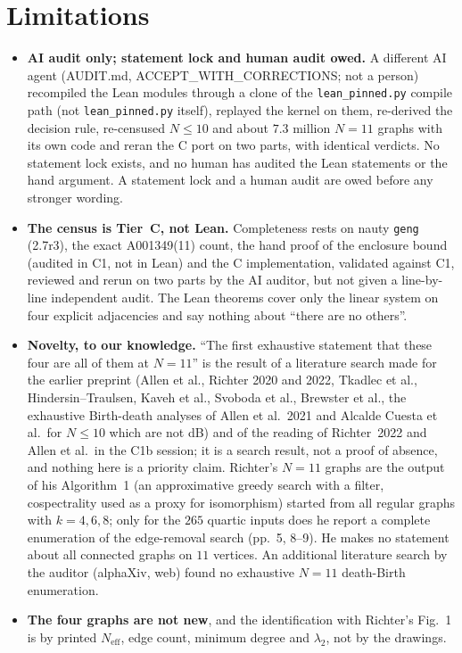 \documentclass[10pt]{article}
\newcommand{\Neff}{N_{\mathrm{eff}}}
\begin{document}
\section{Limitations}\label{sec:lim}
\begin{itemize}\itemsep=1pt
\item \textbf{AI audit only; statement lock and human audit owed.} A different AI agent (AUDIT.md, ACCEPT\_WITH\_CORRECTIONS; not a person) recompiled the Lean modules through a clone of the \texttt{lean\_pinned.py} compile path (not \texttt{lean\_pinned.py} itself), replayed the kernel on them, re-derived the decision rule, re-censused $N\le10$ and about $7.3$ million $N=11$ graphs with its own code and reran the C port on two parts, with identical verdicts. No statement lock exists, and no human has audited the Lean statements or the hand argument. A statement lock and a human audit are owed before any stronger wording.
\item \textbf{The census is Tier~C, not Lean.} Completeness rests on nauty \texttt{geng} (2.7r3), the exact A001349(11) count, the hand proof of the enclosure bound (audited in C1, not in Lean) and the C implementation, validated against C1, reviewed and rerun on two parts by the AI auditor, but not given a line-by-line independent audit. The Lean theorems cover only the linear system on four explicit adjacencies and say nothing about ``there are no others''.
\item \textbf{Novelty, to our knowledge.} ``The first exhaustive statement that these four are all of them at $N=11$'' is the result of a literature search made for the earlier preprint (Allen et al., Richter 2020 and 2022, Tkadlec et al., Hindersin--Traulsen, Kaveh et al., Svoboda et al., Brewster et al., the exhaustive Birth-death analyses of Allen et al.~2021 and Alcalde Cuesta et al.\ for $N\le10$ which are not dB) and of the reading of Richter~2022 and Allen et al.\ in the C1b session; it is a search result, not a proof of absence, and nothing here is a priority claim. Richter's $N=11$ graphs are the output of his Algorithm~1 (an approximative greedy search with a filter, cospectrality used as a proxy for isomorphism) started from all regular graphs with $k=4,6,8$; only for the $265$ quartic inputs does he report a complete enumeration of the edge-removal search (pp.~5, 8--9). He makes no statement about all connected graphs on $11$ vertices. An additional literature search by the auditor (alphaXiv, web) found no exhaustive $N=11$ death-Birth enumeration.
\item \textbf{The four graphs are not new}, and the identification with Richter's Fig.~1 is by printed $\Neff$, edge count, minimum degree and $\lambda_2$, not by the drawings.

\end{itemize}
\end{document}
